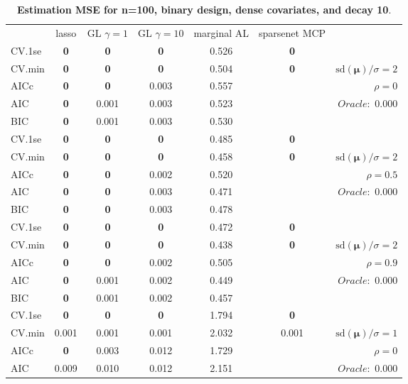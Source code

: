 \clearpage
\begin{table}\vspace{-.5cm}
\caption[l]{ { \bf Estimation MSE for n=100, binary design, 
dense covariates, and  decay  10}.}
\vspace{-.5cm}
\footnotesize{}
\begin{center}
\begin{tabular}{l*{5}{c}|r}
& lasso & GL $\gamma=1$ & GL $\gamma=10$ & marginal AL & sparsenet MCP  & \\
 \cline{1-7}
CV.1se & {\bf 0} & {\bf 0} & {\bf 0} & 0.526 & {\bf 0} & \\
CV.min & {\bf 0} & {\bf 0} & {\bf 0} & 0.504 & {\bf 0} &  $\mathrm{sd}(\mathbf{\mu})/\sigma=2$ \\
AICc & {\bf 0} & {\bf 0} & 0.003 & 0.557 & & $\rho=0$ \\
AIC & {\bf 0} & 0.001 & 0.003 & 0.523 & &  \multirow{2}{*}{$Oracle: $ 0.000} \\
BIC & {\bf 0} & 0.001 & 0.003 & 0.530 & &  \\
 \hline 
CV.1se & {\bf 0} & {\bf 0} & {\bf 0} & 0.485 & {\bf 0} & \\
CV.min & {\bf 0} & {\bf 0} & {\bf 0} & 0.458 & {\bf 0} &  $\mathrm{sd}(\mathbf{\mu})/\sigma=2$ \\
AICc & {\bf 0} & {\bf 0} & 0.002 & 0.520 & & $\rho=0.5$ \\
AIC & {\bf 0} & {\bf 0} & 0.003 & 0.471 & &  \multirow{2}{*}{$Oracle: $ 0.000} \\
BIC & {\bf 0} & {\bf 0} & 0.003 & 0.478 & &  \\
 \hline 
CV.1se & {\bf 0} & {\bf 0} & {\bf 0} & 0.472 & {\bf 0} & \\
CV.min & {\bf 0} & {\bf 0} & {\bf 0} & 0.438 & {\bf 0} &  $\mathrm{sd}(\mathbf{\mu})/\sigma=2$ \\
AICc & {\bf 0} & {\bf 0} & 0.002 & 0.505 & & $\rho=0.9$ \\
AIC & {\bf 0} & 0.001 & 0.002 & 0.449 & &  \multirow{2}{*}{$Oracle: $ 0.000} \\
BIC & {\bf 0} & 0.001 & 0.002 & 0.457 & &  \\
 \hline 
CV.1se & {\bf 0} & {\bf 0} & {\bf 0} & 1.794 & {\bf 0} & \\
CV.min & 0.001 & 0.001 & 0.001 & 2.032 & 0.001 &  $\mathrm{sd}(\mathbf{\mu})/\sigma=1$ \\
AICc & {\bf 0} & 0.003 & 0.012 & 1.729 & & $\rho=0$ \\
AIC & 0.009 & 0.010 & 0.012 & 2.151 & &  \multirow{2}{*}{$Oracle: $ 0.000} \\

\end{tabular}
\end{center}
\end{table}
